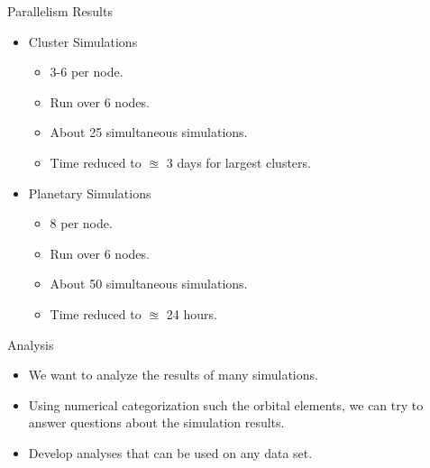\documentclass{beamer}
\begin{document}
\begin{frame}{Parallelism Results}
    \begin{itemize}
        \item Cluster Simulations
            \begin{itemize}
                \item 3-6 per node.
                \item Run over 6 nodes.
                \item About 25 simultaneous simulations.
                \item Time reduced to $\approxeq$ 3 days for largest clusters.
            \end{itemize}
        \item Planetary Simulations
            \begin{itemize}
                \item 8 per node.
                \item Run over 6 nodes.
                \item About 50 simultaneous simulations.
                \item Time reduced to $\approxeq$ 24 hours.
            \end{itemize}
    \end{itemize}
\end{frame}


\begin{frame}{Analysis}
    \begin{itemize}
        \item We want to analyze the results of many
            simulations.
        \item Using numerical categorization such the orbital elements,
            we can try to answer questions about the simulation results.
        \item Develop analyses that can be used on any data set.
    \end{itemize}
\end{frame}
\end{document}
